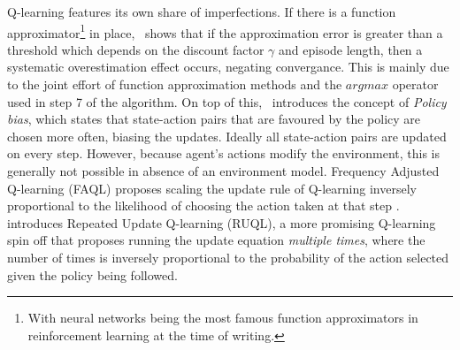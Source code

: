 \documentclass{../main.tex}{subfiles}
\begin{document}
Q-learning features its own share of imperfections. If there is a function approximator\footnote{With neural networks being the most famous function approximators in reinforcement learning at the time of writing.} in place,~\cite{Thrun1993} shows that if the approximation error is greater than a threshold which depends on the discount factor $\gamma$ and episode length, then a systematic overestimation effect occurs, negating convergance. This is mainly due to the joint effort of function approximation methods and the $argmax$ operator used in step 7 of the algorithm. On top of this,~\cite{Kaisers2010} introduces the concept of \textit{Policy bias}, which states that state-action pairs that are favoured by the policy are chosen more often, biasing the updates. Ideally all state-action pairs are updated on every step. However, because agent's actions modify the environment, this is generally not possible in absence of an environment model. Frequency Adjusted Q-learning (FAQL) proposes scaling the update rule of Q-learning inversely proportional to the likelihood of choosing the action taken at that step \citep{Kaisers2010}.~\cite{Abdallah2016} introduces Repeated Update Q-learning (RUQL), a more promising Q-learning spin off that proposes running the update equation \textit{multiple times}, where the number of times is inversely proportional to the probability of the action selected given the policy being followed.

\end{document}
